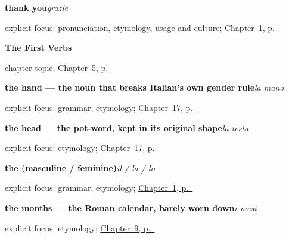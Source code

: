 \noindent\begin{minipage}[t]{\linewidth}
\raggedright
\textbf{thank you}\enspace\emph{grazie}\par
\footnotesize explicit focus: pronunciation, etymology, usage and culture; \hyperref[ch:greetings]{Chapter~1, p.~\pageref*{ch:greetings}}
\end{minipage}\par\smallskip

\noindent\begin{minipage}[t]{\linewidth}
\raggedright
\textbf{The First Verbs}\par
\footnotesize chapter topic; \hyperref[ch:it-first-verbs]{Chapter~5, p.~\pageref*{ch:it-first-verbs}}
\end{minipage}\par\smallskip

\noindent\begin{minipage}[t]{\linewidth}
\raggedright
\textbf{the hand — the noun that breaks Italian's own gender rule}\enspace\emph{la mano}\par
\footnotesize explicit focus: grammar, etymology; \hyperref[ch:it-head-and-hand]{Chapter~17, p.~\pageref*{ch:it-head-and-hand}}
\end{minipage}\par\smallskip

\noindent\begin{minipage}[t]{\linewidth}
\raggedright
\textbf{the head — the pot-word, kept in its original shape}\enspace\emph{la testa}\par
\footnotesize explicit focus: etymology; \hyperref[ch:it-head-and-hand]{Chapter~17, p.~\pageref*{ch:it-head-and-hand}}
\end{minipage}\par\smallskip

\noindent\begin{minipage}[t]{\linewidth}
\raggedright
\textbf{the (masculine / feminine)}\enspace\emph{il / la / lo}\par
\footnotesize explicit focus: grammar, etymology; \hyperref[ch:greetings]{Chapter~1, p.~\pageref*{ch:greetings}}
\end{minipage}\par\smallskip

\noindent\begin{minipage}[t]{\linewidth}
\raggedright
\textbf{the months — the Roman calendar, barely worn down}\enspace\emph{i mesi}\par
\footnotesize explicit focus: etymology; \hyperref[ch:it-months-and-seasons]{Chapter~9, p.~\pageref*{ch:it-months-and-seasons}}
\end{minipage}\par\smallskip

